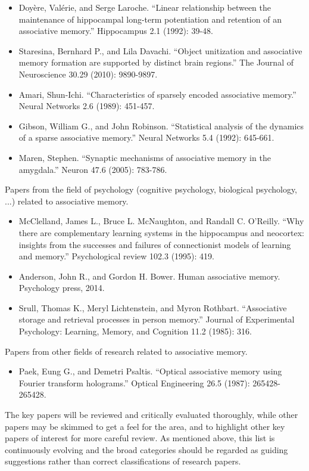 \documentclass[12pt, a4paper]{article}
\begin{document}
\begin{itemize}
	\item Doyère, Valérie, and Serge Laroche. ``Linear relationship between the maintenance of hippocampal long-term potentiation and retention of an associative memory.'' Hippocampus 2.1 (1992): 39-48.
	\item Staresina, Bernhard P., and Lila Davachi. ``Object unitization and associative memory formation are supported by distinct brain regions.'' The Journal of Neuroscience 30.29 (2010): 9890-9897.
	\item Amari, Shun-Ichi. ``Characteristics of sparsely encoded associative memory.'' Neural Networks 2.6 (1989): 451-457.
	\item Gibson, William G., and John Robinson. ``Statistical analysis of the dynamics of a sparse associative memory.'' Neural Networks 5.4 (1992): 645-661.
	\item Maren, Stephen. ``Synaptic mechanisms of associative memory in the amygdala.'' Neuron 47.6 (2005): 783-786.
\end{itemize}

Papers from the field of psychology (cognitive psychology, biological psychology, ...) related to associative memory.

\begin{itemize}
	\item McClelland, James L., Bruce L. McNaughton, and Randall C. O'Reilly. ``Why there are complementary learning systems in the hippocampus and neocortex: insights from the successes and failures of connectionist models of learning and memory.'' Psychological review 102.3 (1995): 419.
	\item Anderson, John R., and Gordon H. Bower. Human associative memory. Psychology press, 2014.
	\item Srull, Thomas K., Meryl Lichtenstein, and Myron Rothbart. ``Associative storage and retrieval processes in person memory.'' Journal of Experimental Psychology: Learning, Memory, and Cognition 11.2 (1985): 316.
\end{itemize}

Papers from other fields of research related to associative memory.

\begin{itemize}
	\item Paek, Eung G., and Demetri Psaltis. ``Optical associative memory using Fourier transform holograms.'' Optical Engineering 26.5 (1987): 265428-265428.
\end{itemize}

The key papers will be reviewed and critically evaluated thoroughly, while other papers may be skimmed to get a feel for the area, and to highlight other key papers of interest for more careful review. As mentioned above, this list is continuously evolving and the broad categories should be regarded as guiding suggestions rather than correct classifications of research papers.
\end{document}
